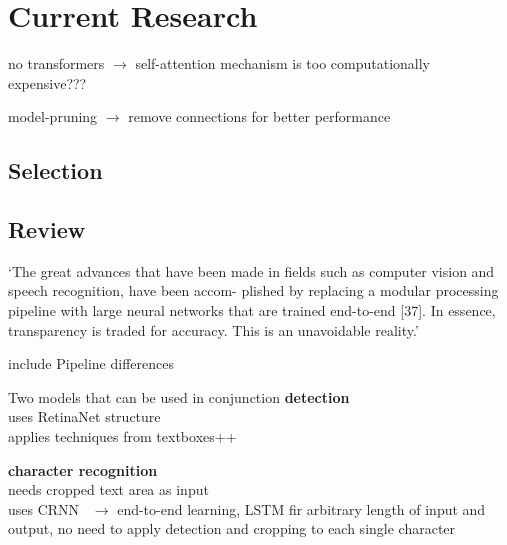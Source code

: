 \chapter{Current Research}\label{ch:research}
no transformers $\rightarrow$ self-attention mechanism is too computationally expensive???

model-pruning $\rightarrow$ remove connections for better performance
\section{Selection}


\section{Review}
`The great advances that have been made in fields such as computer vision and speech recognition,
have been accom- plished by replacing a modular processing pipeline with large neural networks
that are trained end-to-end [37]. In essence, transparency is traded for accuracy.
This is an unavoidable reality.'\cite{arpteg_software_2018}

include Pipeline differences


Two models that can be used in conjunction
\textbf{detection}~\cite{beom_text_2021}\\
uses RetinaNet structure~\cite{lin_focal_2018}\\
applies techniques from textboxes++~\cite{liao_textboxes_2018}

\textbf{character recognition}~\cite{beom_crnn_2021}\\
needs cropped text area as input\\
uses CRNN~\cite{shi_end--end_2015} $\rightarrow$ end-to-end learning, LSTM fir arbitrary length of
input and output, no need to apply detection and cropping to each single character

